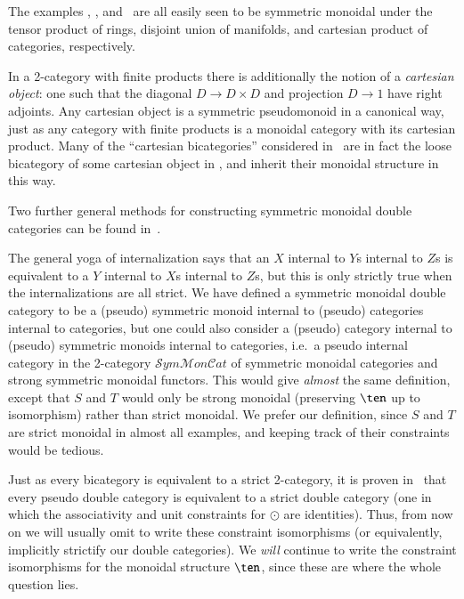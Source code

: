 \begin{eg}
  The examples \lMod, \lnCob, and \lProf\ are all easily seen to be
  symmetric monoidal under the tensor product of rings, disjoint union
  of manifolds, and cartesian product of categories, respectively.
\end{eg}

\begin{rmk}
  In a 2-category with finite products there is additionally the
  notion of a \emph{cartesian object}: one such that the diagonal
  $D\to D\times D$ and projection $D\to 1$ have right adjoints.  Any
  cartesian object is a symmetric pseudomonoid in a canonical way,
  just as any category with finite products is a monoidal category
  with its cartesian product.  Many of the ``cartesian bicategories''
  considered in~\cite{cw:cart-bicats-i,ckww:cartbicats-ii} are in
  fact the loose bicategory of some cartesian object in \cDbl,
  and inherit their monoidal structure in this way.
\end{rmk}

Two further general methods for constructing symmetric monoidal double
categories can be found in~\cite{shulman:frbi}.

\begin{rmk}
  The general yoga of internalization says that an $X$ internal to
  $Y$s internal to $Z$s is equivalent to a $Y$ internal to $X$s
  internal to $Z$s, but this is only strictly true when the
  internalizations are all strict.  We have defined a symmetric
  monoidal double category to be a (pseudo) symmetric monoid internal
  to (pseudo) categories internal to categories, but one could also
  consider a (pseudo) category internal to (pseudo) symmetric monoids
  internal to categories, i.e.\ a pseudo internal category in the
  2-category
  $\mathcal{S}\mathit{ym}\mathcal{M}\mathit{on}\mathcal{C}\mathit{at}$
  of symmetric monoidal categories and strong symmetric monoidal
  functors.  This would give \emph{almost} the same definition, except
  that $S$ and $T$ would only be strong monoidal (preserving $\ten$ up
  to isomorphism) rather than strict monoidal.  We prefer our
  definition, since $S$ and $T$ are strict monoidal in almost all
  examples, and keeping track of their constraints would be tedious.
\end{rmk}

Just as every bicategory is equivalent to a strict 2-category, it is
proven in~\cite{gp:double-limits} that every pseudo double category is
equivalent to a strict double category (one in which the associativity
and unit constraints for $\odot$ are identities).  Thus, from now on
we will usually omit to write these constraint isomorphisms (or
equivalently, implicitly strictify our double categories).  We
\emph{will} continue to write the constraint isomorphisms for the
monoidal structure $\ten$, since these are where the whole question
lies.


